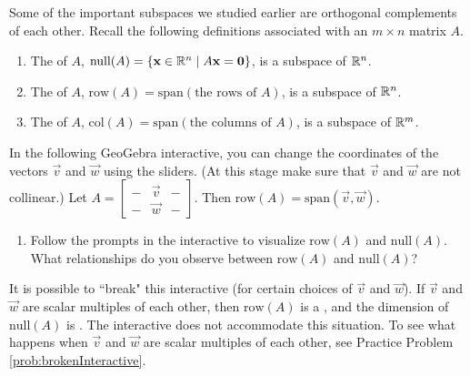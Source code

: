 \documentclass{ximera}
\begin{document}
Some of the important subspaces we studied earlier are orthogonal complements of each other.  Recall the following definitions associated with an $m \times n$ matrix $A$.
\begin{enumerate}
    \item The  of $A$, $\mbox{null}(A) = \{\mathbf{x}\in \mathbb{R}^n \mid A\mathbf{x} = \mathbf{0}\}$, is a subspace of $\mathbb{R}^n$.
    \item The  of $A$, $\mbox{row}(A) = \mbox{span} ( \mbox{the rows of } A)$, is a subspace of $\mathbb{R}^n$.
    \item The  of $A$, $\mbox{col}(A) = \mbox{span} ( \mbox{the columns of } A)$, is a subspace of $\mathbb{R}^m$.
\end{enumerate}

\begin{exploration}\label{exp:discoverortho}
In the following GeoGebra interactive, you can change the coordinates of the vectors $\vec{v}$ and $\vec{w}$ using the sliders.  (At this stage make sure that $\vec{v}$ and $\vec{w}$ are not collinear.) Let $A=\begin{bmatrix}-&\vec{v}&-\\-&\vec{w}&-\end{bmatrix}$.  Then $\mbox{row}(A) = \mbox{span}(\vec{v},\vec{w})$.  
   
\begin{center}
\end{center}

\begin{enumerate}
        \item Follow the prompts in the interactive to visualize $\mbox{row}(A)$ and $\mbox{null}(A)$.  What relationships do you observe between $\mbox{row}(A)$ and $\mbox{null}(A)$? 
        \end{enumerate}

  It is possible to ``break" this interactive (for certain choices of $\vec{v}$ and $\vec{w}$). If $\vec{v}$ and $\vec{w}$ are scalar multiples of each other, then $\mbox{row}(A)$ is a , and the dimension of $\mbox{null}(A)$ is .  The interactive does not accommodate this situation.  To see what happens when $\vec{v}$ and $\vec{w}$ are scalar multiples of each other, see Practice Problem \ref{prob:brokenInteractive}.
\end{exploration}
\end{document}
